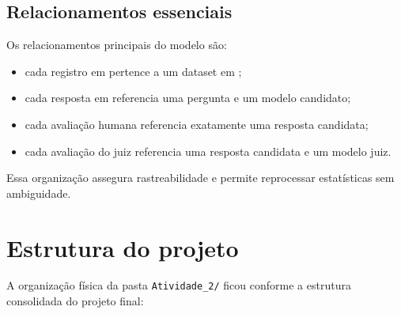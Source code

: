 \documentclass[12pt,a4paper]{article}
\begin{document}
\subsection{Relacionamentos essenciais}

Os relacionamentos principais do modelo são:

\begin{itemize}[leftmargin=1.2cm]
    \item cada registro em  pertence a um dataset em ;
    \item cada resposta em  referencia uma pergunta e um modelo candidato;
    \item cada avaliação humana referencia exatamente uma resposta candidata;
    \item cada avaliação do juiz referencia uma resposta candidata e um modelo juiz.
\end{itemize}

Essa organização assegura rastreabilidade e permite reprocessar estatísticas sem ambiguidade.

\section{Estrutura do projeto}

A organização física da pasta \texttt{Atividade\_2/} ficou conforme a estrutura consolidada do projeto final:
\end{document}
